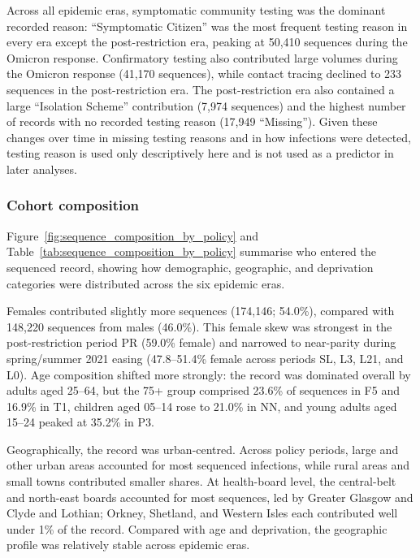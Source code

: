 Across all epidemic eras, symptomatic community testing was the dominant recorded reason: ``Symptomatic Citizen'' was the most frequent testing reason in every era except the post-restriction era, peaking at 50,410 sequences during the Omicron response. Confirmatory testing also contributed large volumes during the Omicron response (41,170 sequences), while contact tracing declined to 233 sequences in the post-restriction era. The post-restriction era also contained a large ``Isolation Scheme'' contribution (7,974 sequences) and the highest number of records with no recorded testing reason (17,949 ``Missing''). Given these changes over time in missing testing reasons and in how infections were detected, testing reason is used only descriptively here and is not used as a predictor in later analyses.

\subsubsection*{Cohort composition}\label{sec:ch4_cohort_composition}

Figure~\ref{fig:sequence_composition_by_policy} and Table~\ref{tab:sequence_composition_by_policy} summarise who entered the sequenced record, showing how demographic, geographic, and deprivation categories were distributed across the six epidemic eras.

Females contributed slightly more sequences (174,146; 54.0\%), compared with 148,220 sequences from males (46.0\%). This female skew was strongest in the post-restriction period PR (59.0\% female) and narrowed to near-parity during spring/summer 2021 easing (47.8--51.4\% female across periods SL, L3, L21, and L0). Age composition shifted more strongly: the record was dominated overall by adults aged 25--64, but the 75+ group comprised 23.6\% of sequences in F5 and 16.9\% in T1, children aged 05--14 rose to 21.0\% in NN, and young adults aged 15--24 peaked at 35.2\% in P3.

Geographically, the record was urban-centred. Across policy periods, large and other urban areas accounted for most sequenced infections, while rural areas and small towns contributed smaller shares. At health-board level, the central-belt and north-east boards accounted for most sequences, led by Greater Glasgow and Clyde and Lothian; Orkney, Shetland, and Western Isles each contributed well under 1\% of the record. Compared with age and deprivation, the geographic profile was relatively stable across epidemic eras.

